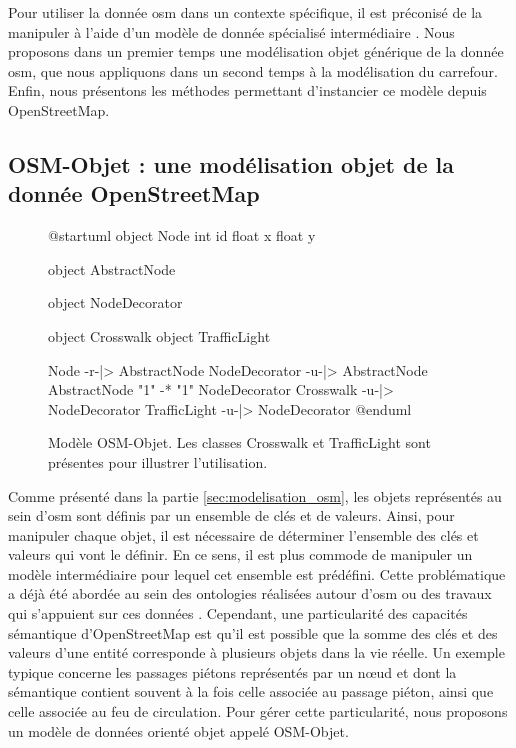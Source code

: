 \label{sec:modelisation_crmodel}

Pour utiliser la donnée \gls{osm} dans un contexte spécifique, il est préconisé de la manipuler à l'aide d'un modèle de donnée spécialisé intermédiaire \cite{Touya2014}. Nous proposons dans un premier temps une modélisation objet générique de la donnée \gls{osm}, que nous appliquons dans un second temps à la modélisation du carrefour. Enfin, nous présentons les méthodes permettant d'instancier ce modèle depuis OpenStreetMap.

\subsection{OSM-Objet : une modélisation objet de la donnée OpenStreetMap}

\begin{figure}
\centering
\begin{plantuml}

    @startuml
    object Node {
        int id
        float x
        float y
    }

    object AbstractNode

    object NodeDecorator

    object Crosswalk
    object TrafficLight

    Node -r-|> AbstractNode
    NodeDecorator -u-|> AbstractNode
    AbstractNode "1" -* "1" NodeDecorator
    Crosswalk -u-|> NodeDecorator
    TrafficLight -u-|> NodeDecorator
    @enduml
    
\end{plantuml}
\caption[Modèle OSM-Objet.]{Modèle OSM-Objet. Les classes Crosswalk et TrafficLight sont présentes pour illustrer l'utilisation.}
\label{fig:modelisation_osm_objet}
\end{figure}

Comme présenté dans la partie \ref{sec:modelisation_osm}, les objets représentés au sein d'\gls{osm} sont définis par un ensemble de clés et de valeurs. Ainsi, pour manipuler chaque objet, il est nécessaire de déterminer l'ensemble des clés et valeurs qui vont le définir. En ce sens, il est plus commode de manipuler un modèle intermédiaire pour lequel cet ensemble est prédéfini. Cette problématique a déjà été abordée au sein des ontologies réalisées autour d'\gls{osm}\cite{Codescu2011,Hombiat2017} ou des travaux qui s'appuient sur ces données \cite{Touya2014}. Cependant, une particularité des capacités sémantique d'OpenStreetMap est qu'il est possible que la somme des clés et des valeurs d'une entité corresponde à plusieurs objets dans la vie réelle. Un exemple typique concerne les passages piétons représentés par un nœud et dont la sémantique contient souvent à la fois celle associée au passage piéton, ainsi que celle associée au feu de circulation. Pour gérer cette particularité, nous proposons un modèle de données orienté objet appelé OSM-Objet.

